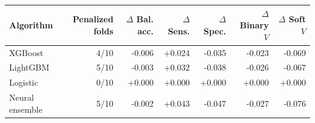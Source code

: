 \begin{tabular}{lrrrrrr}
\toprule
Algorithm & Penalized folds & $\Delta$ Bal. acc. & $\Delta$ Sens. & $\Delta$ Spec. & $\Delta$ Binary $V$ & $\Delta$ Soft $V$ \\
\midrule
XGBoost & 4/10 & -0.006 & +0.024 & -0.035 & -0.023 & -0.069 \\
LightGBM & 5/10 & -0.003 & +0.032 & -0.038 & -0.026 & -0.067 \\
Logistic & 0/10 & +0.000 & +0.000 & +0.000 & +0.000 & +0.000 \\
Neural ensemble & 5/10 & -0.002 & +0.043 & -0.047 & -0.027 & -0.076 \\
\bottomrule
\end{tabular}
